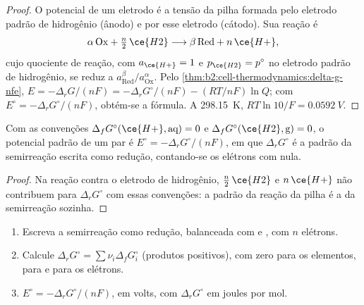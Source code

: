 \begin{proof}
O potencial de um eletrodo é a tensão da pilha formada pelo eletrodo padrão
de hidrogênio (ânodo) e por esse eletrodo (cátodo). Sua reação é
\[
  \alpha\,\mathrm{Ox} + \tfrac n2\,\ce{H2} \longrightarrow \beta\,\mathrm{Red} + n\,\ce{H+} ,
\]
cujo quociente de reação, com $a_{\ce{H+}} = 1$ e $p_{\ce{H2}} = p^\circ$ no
eletrodo padrão de hidrogênio, se reduz a $a_{\mathrm{Red}}^\beta/
a_{\mathrm{Ox}}^\alpha$. Pelo \cref{thm:b2:cell-thermodynamics:delta-g-nfe},
$E = -\Delta_r G/(nF) = -\Delta_r G^\circ/(nF) - (RT/nF)\ln Q$; com $E^\circ =
-\Delta_r G^\circ/(nF)$, obtém-se a fórmula. A \qty{298.15}{K}, $RT\ln 10/F =
\qty{0.0592}{V}$.
\end{proof}

\begin{proposition}\label{prop:b2:cell-thermodynamics:standard-potential}
Com as convenções $\Delta_f G^\circ(\ce{H+}, \text{aq}) = 0$ e
$\Delta_f G^\circ(\ce{H2}, \text{g}) = 0$, o potencial padrão de um par é
$E^\circ = -\Delta_r G^\circ/(nF)$, em que $\Delta_r G^\circ$ é a  padrão da semirreação escrita como redução, contando-se os elétrons
com  nula.
\end{proposition}

\begin{proof}
Na reação contra o eletrodo de hidrogênio, $\tfrac n2\,\ce{H2}$ e
$n\,\ce{H+}$ não contribuem para $\Delta_r G^\circ$ com essas convenções: a
 padrão da reação da pilha é a da semirreação sozinha.
\end{proof}

\begin{method}\label{met:b2:cell-thermodynamics:e-from-gibbs}
\begin{enumerate}
  \item Escreva a semirreação como redução, balanceada com  e
        , com $n$ elétrons.
  \item Calcule $\Delta_r G^\circ = \sum\nu_i\Delta_f G^\circ_i$ (produtos
        positivos), com zero para os elementos, para  e para os elétrons.
  \item $E^\circ = -\Delta_r G^\circ/(nF)$, em volts, com $\Delta_r G^\circ$ em
        joules por mol.
\end{enumerate}
\end{method}

